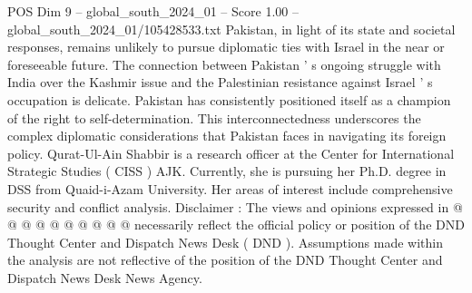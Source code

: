 \begin{textsample}{POS Dim 9 – global\_south\_2024\_01 – Score 1.00 – global\_south\_2024\_01/105428533.txt}
Pakistan, in light of its state and societal responses, remains unlikely to pursue diplomatic ties with Israel in the near or foreseeable future.
The connection between Pakistan ' s ongoing struggle with India over the Kashmir issue and the Palestinian resistance against Israel ' s occupation is delicate.
Pakistan has consistently positioned itself as a champion of the right to self-determination.
This interconnectedness underscores the complex diplomatic considerations that Pakistan faces in navigating its foreign policy.
Qurat-Ul-Ain Shabbir is a research officer at the Center for International Strategic Studies ( CISS ) AJK.
Currently, she is pursuing her Ph.D. degree in DSS from Quaid-i-Azam University.
Her areas of interest include comprehensive security and conflict analysis.
Disclaimer : The views and opinions expressed in @ @ @ @ @ @ @ @ @ @ necessarily reflect the official policy or position of the DND Thought Center and Dispatch News Desk ( DND ).
Assumptions made within the analysis are not reflective of the position of the DND Thought Center and Dispatch News Desk News Agency.

\end{textsample}
